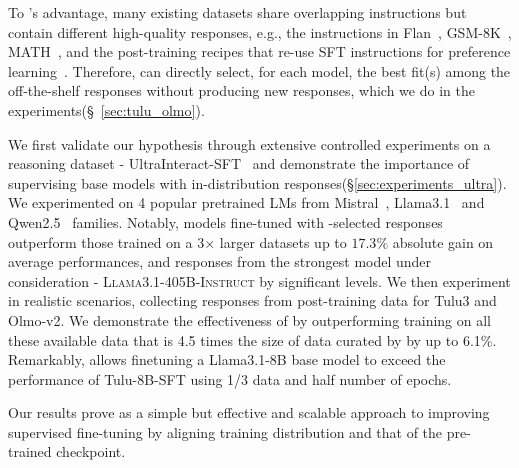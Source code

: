 To \name's advantage, many existing datasets share overlapping instructions but contain different high-quality responses, e.g.,
the instructions in Flan~\cite{longpre2023flan}, GSM-8K~\cite{cobbe2021trainingverifierssolvemath}, MATH~\cite{hendrycks2021measuringmathematicalproblemsolving},
and the post-training recipes that re-use SFT instructions for preference learning~\cite{lambert2024tulu3,olmo2025}.
Therefore, \name can directly select, for each model, the best fit(s) among the off-the-shelf responses without producing new responses, which we do in the experiments(\S~\ref{sec:tulu_olmo}).

We first validate our hypothesis through extensive controlled experiments on a reasoning dataset - UltraInteract-SFT~\cite{yuan2024eurus} and demonstrate the importance of supervising base models with in-distribution responses(\S\ref{sec:experiments_ultra}). We experimented on 4 popular pretrained LMs from Mistral~\cite{mistralai_codestral_2024}, Llama3.1~\cite{dubey2024llama3herdmodels} and Qwen2.5~\cite{hui2024qwen25} families. 
Notably, models fine-tuned with \name-selected responses outperform those trained on a 3$\times$ larger datasets up to $17.3\%$ absolute gain on average performances, and responses from the strongest model under consideration - \textsc{Llama3.1-405B-Instruct} by significant levels. 
We then experiment in realistic scenarios, collecting responses from post-training data for Tulu3 and Olmo-v2. We demonstrate the effectiveness of \name by outperforming training on all these available data that is 4.5 times the size of data curated by \name by up to 6.1\%.  Remarkably, \name allows finetuning a Llama3.1-8B base model to exceed the performance of Tulu-8B-SFT using 1/3 data and half number of epochs.

Our results prove \name as a simple but effective and scalable approach to improving supervised fine-tuning by aligning training distribution and that of the pre-trained checkpoint. 


